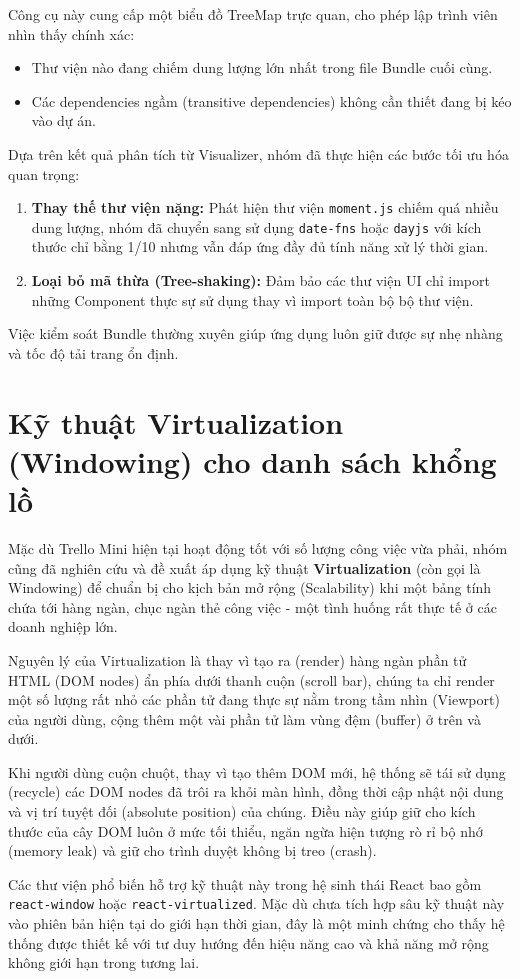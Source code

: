 Công cụ này cung cấp một biểu đồ TreeMap trực quan, cho phép lập trình viên nhìn thấy chính xác:
\begin{itemize}
    \item Thư viện nào đang chiếm dung lượng lớn nhất trong file Bundle cuối cùng.
    \item Các dependencies ngầm (transitive dependencies) không cần thiết đang bị kéo vào dự án.
\end{itemize}

Dựa trên kết quả phân tích từ Visualizer, nhóm đã thực hiện các bước tối ưu hóa quan trọng:
\begin{enumerate}
    \item \textbf{Thay thế thư viện nặng:} Phát hiện thư viện \texttt{moment.js} chiếm quá nhiều dung lượng, nhóm đã chuyển sang sử dụng \texttt{date-fns} hoặc \texttt{dayjs} với kích thước chỉ bằng 1/10 nhưng vẫn đáp ứng đầy đủ tính năng xử lý thời gian.
    \item \textbf{Loại bỏ mã thừa (Tree-shaking):} Đảm bảo các thư viện UI chỉ import những Component thực sự sử dụng thay vì import toàn bộ bộ thư viện.
\end{enumerate}
Việc kiểm soát Bundle thường xuyên giúp ứng dụng luôn giữ được sự nhẹ nhàng và tốc độ tải trang ổn định.

\section{Kỹ thuật Virtualization (Windowing) cho danh sách khổng lồ}
Mặc dù Trello Mini hiện tại hoạt động tốt với số lượng công việc vừa phải, nhóm cũng đã nghiên cứu và đề xuất áp dụng kỹ thuật \textbf{Virtualization} (còn gọi là Windowing) để chuẩn bị cho kịch bản mở rộng (Scalability) khi một bảng tính chứa tới hàng ngàn, chục ngàn thẻ công việc - một tình huống rất thực tế ở các doanh nghiệp lớn.

Nguyên lý của Virtualization là thay vì tạo ra (render) hàng ngàn phần tử HTML (DOM nodes) ẩn phía dưới thanh cuộn (scroll bar), chúng ta chỉ render một số lượng rất nhỏ các phần tử đang thực sự nằm trong tầm nhìn (Viewport) của người dùng, cộng thêm một vài phần tử làm vùng đệm (buffer) ở trên và dưới.

Khi người dùng cuộn chuột, thay vì tạo thêm DOM mới, hệ thống sẽ tái sử dụng (recycle) các DOM nodes đã trôi ra khỏi màn hình, đồng thời cập nhật nội dung và vị trí tuyệt đối (absolute position) của chúng. Điều này giúp giữ cho kích thước của cây DOM luôn ở mức tối thiểu, ngăn ngừa hiện tượng rò rỉ bộ nhớ (memory leak) và giữ cho trình duyệt không bị treo (crash).

Các thư viện phổ biến hỗ trợ kỹ thuật này trong hệ sinh thái React bao gồm \texttt{react-window} hoặc \texttt{react-virtualized}. Mặc dù chưa tích hợp sâu kỹ thuật này vào phiên bản hiện tại do giới hạn thời gian, đây là một minh chứng cho thấy hệ thống được thiết kế với tư duy hướng đến hiệu năng cao và khả năng mở rộng không giới hạn trong tương lai.
